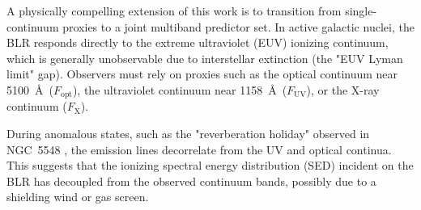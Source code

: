 \documentclass[12pt, a4paper]{article}
\begin{document}
A physically compelling extension of this work is to transition from single-continuum proxies to a joint multiband predictor set. In active galactic nuclei, the BLR responds directly to the extreme ultraviolet (EUV) ionizing continuum, which is generally unobservable due to interstellar extinction (the "EUV Lyman limit" gap). Observers must rely on proxies such as the optical continuum near 5100~\AA\ ($F_{\mathrm{opt}}$), the ultraviolet continuum near 1158~\AA\ ($F_{\mathrm{UV}}$), or the X-ray continuum ($F_{\mathrm{X}}$).

During anomalous states, such as the "reverberation holiday" observed in NGC~5548 \cite{Dehghanian2019}, the emission lines decorrelate from the UV and optical continua. This suggests that the ionizing spectral energy distribution (SED) incident on the BLR has decoupled from the observed continuum bands, possibly due to a shielding wind or gas screen.
\end{document}
